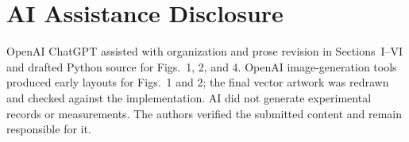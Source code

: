 \documentclass[journal]{IEEEtran}
\begin{document}
\section*{AI Assistance Disclosure}
OpenAI ChatGPT assisted with organization and prose revision in Sections~I--VI
and drafted Python source for Figs.~1, 2, and 4. OpenAI image-generation tools
produced early layouts for Figs.~1 and 2; the final vector artwork was redrawn
and checked against the implementation. AI did not generate experimental
records or measurements. The authors verified the submitted content and
remain responsible for it.



\end{document}

